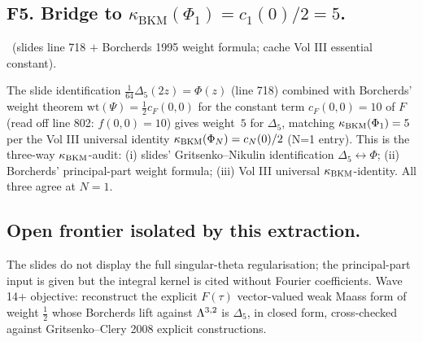 \subsection*{F5. Bridge to $\kappa_{\mathrm{BKM}}(\Phi_1)=c_1(0)/2=5$.}
\ClaimStatusTheorem\ (slides line 718 $+$ Borcherds 1995 weight
formula; cache Vol III essential constant).

The slide identification $\tfrac{1}{64}\Delta_5(2z)=\Phi(z)$ (line 718)
combined with Borcherds' weight theorem
$\mathrm{wt}(\Psi)=\tfrac12 c_F(0,0)$ for the constant term $c_F(0,0)=10$
of $F$ (read off line 802: $f(0,0)=10$) gives weight~$5$ for $\Delta_5$,
matching $\kappa_{\mathrm{BKM}}(\Phi_1)=5$ per the Vol III universal identity
$\kappa_{\mathrm{BKM}}(\Phi_N)=c_N(0)/2$ (N=1 entry). This is the three-way
$\kappa_{\mathrm{BKM}}$-audit: (i) slides' Gritsenko--Nikulin identification
$\Delta_5\leftrightarrow\Phi$; (ii) Borcherds' principal-part weight
formula; (iii) Vol III universal $\kappa_{\mathrm{BKM}}$-identity. All three agree at
$N=1$.

\subsection*{Open frontier isolated by this extraction.}
The slides do not display the full singular-theta regularisation; the
principal-part input is given but the integral kernel is cited without
Fourier coefficients. Wave 14+ objective: reconstruct the explicit
$F(\tau)$ vector-valued weak Maass form of weight $\tfrac12$ whose
Borcherds lift against $\Lambda^{3,2}$ is $\Delta_5$, in closed form,
cross-checked against Gritsenko--Clery 2008 explicit constructions.
